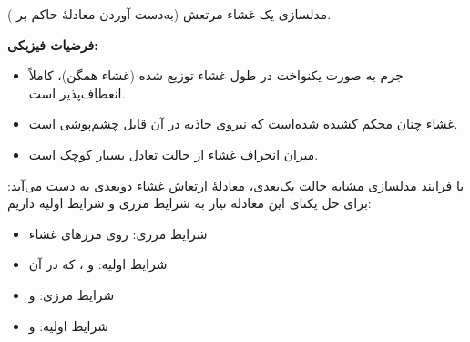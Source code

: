 
مدلسازی یک غشاء مرتعش (به‌دست آوردن معادلهٔ حاکم بر ).

\textbf{فرضیات فیزیکی:}

\begin{itemize}
\tightlist
\item
  جرم به صورت یکنواخت در طول غشاء توزیع شده (غشاء همگن)، کاملاً انعطاف‌پذیر است.
\item
  غشاء چنان محکم کشیده شده‌است که نیروی جاذبه در آن قابل چشم‌پوشی است.
\item
  میزان انحراف غشاء از حالت تعادل بسیار کوچک است.
\end{itemize}


با فرایند مدلسازی مشابه حالت یک‌بعدی، معادلهٔ ارتعاش غشاء دوبعدی به دست می‌آید:
برای حل یکتای این معادله نیاز به شرایط مرزی و شرایط اولیه داریم:

\begin{itemize}
\tightlist
\item
  شرایط مرزی:  روی مرزهای غشاء
\item
  شرایط اولیه:  و ، که در آن 
\end{itemize}





\begin{itemize}
\tightlist
\item
  شرایط مرزی:  و 
\item
  شرایط اولیه:  و 
\end{itemize}

